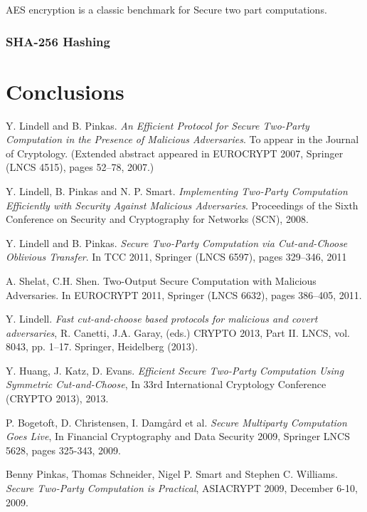 \documentclass[ %
                    author={Nicholas Tutte},
                supervisor={Prof. Nigel Smart},
                    degree={MEng},
                     title={Secure Two Party Computation},
                  subtitle={A practical comparison of recent protocols},
                      type={Research - GG1K},
                      year={2015} ]{dissertation}
\begin{document}
				AES encryption is a classic benchmark for Secure two part computations. 
			\subsection{SHA-256 Hashing}

	\chapter{Conclusions}

		

	\begin{thebibliography}{99}

			Y. Lindell and B. Pinkas. \emph{An Efficient Protocol for Secure Two-Party Computation in the Presence of Malicious Adversaries}. To appear in the Journal of Cryptology. (Extended abstract appeared in EUROCRYPT 2007, Springer (LNCS 4515), pages 52–78, 2007.)

			Y. Lindell, B. Pinkas and N. P. Smart. \emph{Implementing Two-Party Computation Efficiently with Security Against Malicious Adversaries}. Proceedings of the Sixth Conference on Security and Cryptography for Networks (SCN), 2008.

			Y. Lindell and B. Pinkas. \emph{Secure Two-Party Computation via Cut-and-Choose Oblivious Transfer}. In TCC 2011, Springer (LNCS 6597), pages 329–346, 2011

			A. Shelat, C.H. Shen. Two-Output Secure Computation with Malicious Adversaries. In EUROCRYPT 2011, Springer (LNCS 6632), pages 386–405, 2011.

			Y. Lindell.
			\emph{Fast cut-and-choose based protocols for malicious and covert adversaries}, R. Canetti, J.A. Garay, (eds.) CRYPTO 2013, Part II. LNCS, vol. 8043, pp. 1–17. Springer, Heidelberg (2013).

			Y. Huang, J. Katz, D. Evans. \emph{Efficient Secure Two-Party Computation Using Symmetric Cut-and-Choose}, In 33rd International Cryptology Conference (CRYPTO 2013), 2013.

			P. Bogetoft, D. Christensen, I. Damgård et al. \emph{Secure Multiparty Computation Goes Live}, In Financial Cryptography and Data Security 2009, Springer LNCS 5628, pages 325-343, 2009.

			Benny Pinkas, Thomas Schneider, Nigel P. Smart and Stephen C. Williams. \emph{Secure Two-Party Computation is Practical}, ASIACRYPT 2009, December 6-10, 2009.


\end{thebibliography}
\end{document}

